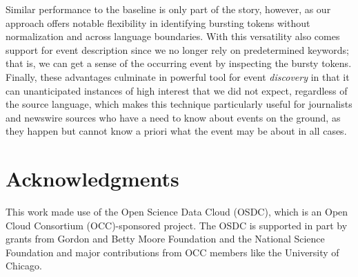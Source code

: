 \documentclass{sig-alternate}
\begin{document}
Similar performance to the baseline is only part of the story, however, as our approach offers notable flexibility in identifying bursting tokens without normalization and across language boundaries.
With this versatility also comes support for event description since we no longer rely on predetermined keywords; that is, we can get a sense of the occurring event by inspecting the bursty tokens.
Finally, these advantages culminate in powerful tool for event \emph{discovery} in that it can unanticipated instances of high interest that we did not expect, regardless of the source language, which makes this technique particularly useful for journalists and newswire sources who have a need to know about events on the ground, as they happen but cannot know a priori what the event may be about in all cases.


\section{Acknowledgments}
This work made use of the Open Science Data Cloud (OSDC), which is an Open Cloud Consortium (OCC)-sponsored project. 
The OSDC is supported in part by grants from Gordon and Betty Moore Foundation and the National Science Foundation and major contributions from OCC members like the University of Chicago. 

%

%
%
\end{document}
